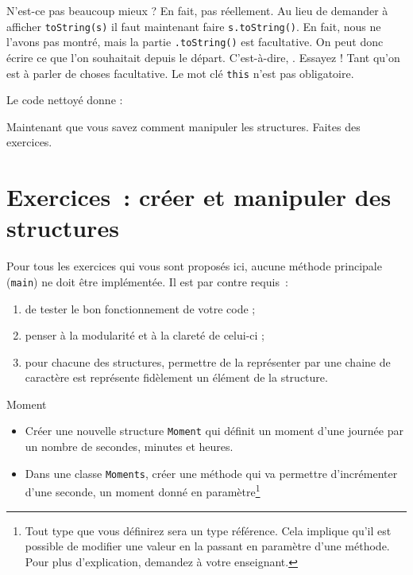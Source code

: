 \documentclass[a4paper,11pt]{article}
\begin{document}

	N'est-ce pas beaucoup mieux ? En fait, pas réellement. Au lieu de demander à afficher \texttt{toString(s)} il faut maintenant faire \texttt{s.toString()}. En fait, nous ne l'avons pas montré, mais la partie \texttt{.toString()} est facultative. On peut donc écrire ce que l'on souhaitait depuis le départ. C'est-à-dire, . Essayez ! Tant qu'on est à parler de choses facultative. Le mot clé \texttt{this} n'est pas obligatoire.

	Le code nettoyé donne :

	Maintenant que vous savez comment manipuler les \og structures\fg. Faites des exercices.


	\bigskip

\section{Exercices~: créer et manipuler des structures}
	
	Pour tous les exercices qui vous sont proposés ici, aucune méthode principale (\texttt{main}) ne doit être implémentée. Il est par contre requis~:
	\begin{enumerate}
		\item de tester le bon fonctionnement de votre code ;
		\item penser à la modularité et à la clareté de celui-ci ;
		\item pour chacune des structures, permettre de la représenter par une chaine de caractère est représente fidèlement un élément de la structure.
	\end{enumerate}

	\begin{Exercice}{Moment}
		\begin{itemize}
			\item
				Créer une nouvelle structure \texttt{Moment} qui définit un moment d'une journée par un nombre de secondes, minutes et heures.
			\item 
				Dans une classe \texttt{Moments}, créer une méthode  qui va permettre d'incrémenter d'une seconde, un moment donné en paramètre\footnote{Tout type que vous définirez sera un type référence. Cela implique qu'il est possible de modifier une valeur en la passant en paramètre d'une méthode. Pour plus d'explication, demandez à votre enseignant.}
		\end{itemize}		
	\end{Exercice}
\end{document}
